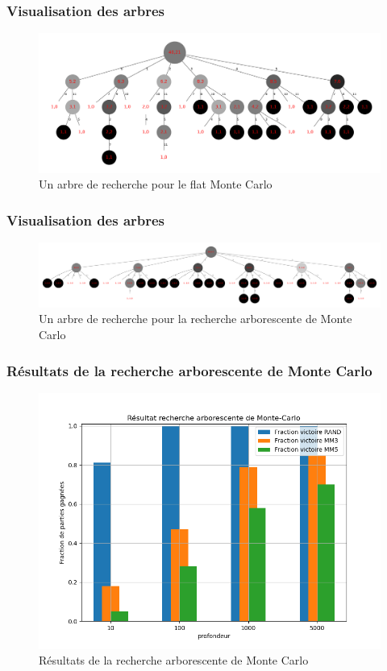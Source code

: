 \documentclass{beamer}
\begin{document}
\begin{frame}
  \frametitle{Visualisation des arbres}
   \begin{figure}
     \centering
     \includegraphics[width=\linewidth]{ressources/arbre_40_flat.pdf}
     \caption{Un arbre de recherche pour le flat Monte Carlo}
   \end{figure}
\end{frame}

\begin{frame}
  \frametitle{Visualisation des arbres}
  \begin{figure}
    \centering
    \includegraphics[width=\linewidth]{ressources/arbre_40_mcts.pdf}
    \caption{Un arbre de recherche pour la recherche arborescente de Monte Carlo}
  \end{figure}
\end{frame}

\begin{frame}
  \frametitle{Résultats de la recherche arborescente de Monte Carlo}
  \begin{figure}
    \centering
    \includegraphics[width=0.7\linewidth]{ressources/resultat_mcts.png}
    \caption{Résultats de la recherche arborescente de Monte Carlo}
  \end{figure}
\end{frame}
\end{document}
